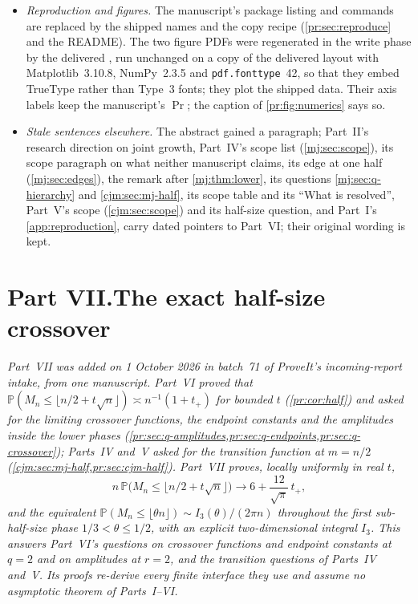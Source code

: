 \documentclass[11pt,a4paper]{article}
\theoremstyle{definition}\newaliascnt{definition}{theorem}
\theoremstyle{remark}\newaliascnt{remark}{theorem}
\newcommand{\ljP}{\mathbb P}
\begin{document}
\begin{itemize}
\item \emph{Reproduction and figures.} The manuscript's package listing and
 commands are replaced by the shipped names and the copy recipe
 (\cref{pr:sec:reproduce} and the README). The two figure PDFs were
 regenerated in the write phase by the delivered , run
 unchanged on a copy of the delivered layout with Matplotlib~3.10.8,
 NumPy~2.3.5 and \texttt{pdf.fonttype}~42, so that they embed TrueType rather
 than Type~3 fonts; they plot the shipped data. Their axis labels keep the
 manuscript's $\Pr$; the caption of \cref{pr:fig:numerics} says so.
\item \emph{Stale sentences elsewhere.} The abstract gained a paragraph;
 Part~II's research direction on joint growth, Part~IV's scope list
 (\cref{mj:sec:scope}), its scope paragraph on what neither manuscript
 claims, its edge at one half (\cref{mj:sec:edges}), the remark after
 \cref{mj:thm:lower}, its questions \cref{mj:sec:q-hierarchy} and
 \cref{cjm:sec:mj-half}, its scope table and its ``What is resolved'',
 Part~V's scope (\cref{cjm:sec:scope}) and its half-size question, and
 Part~I's \cref{app:reproduction}, carry dated pointers to Part~VI; their
 original wording is kept.
\end{itemize}


\clearpage
{}\part*{Part VII.\quad The exact half-size crossover}

\noindent\emph{Part~VII was added on 1 October 2026 in batch~71 of
ProveIt's incoming-report intake, from one manuscript. Part~VI proved that
$\ljP(M_n\le\lfloor n/2+t\sqrt n\rfloor)\asymp n^{-1}(1+t_+)$ for bounded
$t$ (\cref{pr:cor:half}) and asked for the limiting crossover functions, the
endpoint constants and the amplitudes inside the lower phases
(\cref{pr:sec:q-amplitudes,pr:sec:q-endpoints,pr:sec:q-crossover}); Parts~IV
and~V asked for the transition function at $m=n/2$
(\cref{cjm:sec:mj-half,pr:sec:cjm-half}). Part~VII proves, locally
uniformly in real $t$,
\[
 n\,\ljP\bigl(M_n\le\lfloor n/2+t\sqrt n\rfloor\bigr)
 \longrightarrow6+\frac{12}{\sqrt\pi}\,t_+,
\]
and the equivalent $\ljP(M_n\le\lfloor\theta n\rfloor)\sim
I_3(\theta)/(2\pi n)$ throughout the first sub-half-size phase
$1/3<\theta\le1/2$, with an explicit two-dimensional integral $I_3$. This
answers Part~VI's questions on crossover functions and endpoint constants at
$q=2$ and on amplitudes at $r=2$, and the transition questions of Parts~IV
and~V. Its proofs re-derive every finite interface they use and assume no
asymptotic theorem of Parts~I--VI.}
\end{document}

